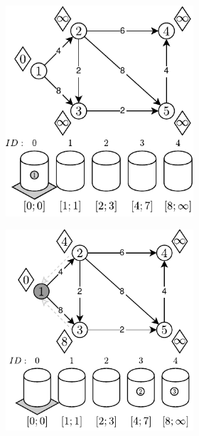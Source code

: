 \begin{figure}[!ht]
	\centering
	\begin{subfigure}[b]{\textwidth}
		\null\hfill
		\begin{subfigure}[b]{0.32\textwidth}
			\includegraphics[width=\textwidth]{Chapter_II/RADIX-HEAP-C-Example/a.pdf}
			\caption{}
			\label{fig:exampleRadixHeapC:a}
		\end{subfigure}
		\hfill
		\begin{subfigure}[b]{0.32\textwidth}
			\includegraphics[width=\textwidth]{Chapter_II/RADIX-HEAP-C-Example/b.pdf}

\end{subfigure}
\end{subfigure}
\end{figure}
